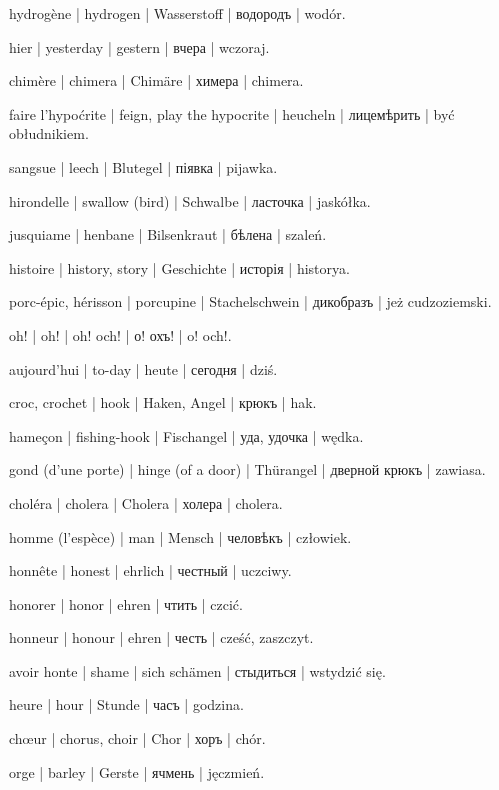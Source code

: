 \begin{outdent}{1em}
hydrogène | hydrogen | Wasserstoff | водородъ | wodór.

hier | yesterday | gestern | вчера | wczoraj.

chimère | chimera | Chimäre | химера | chimera.

faire l’hypoćrite | feign, play the hypocrite | heucheln | лицемѣрить | być obłudnikiem.

sangsue | leech | Blutegel | піявка | pijawka.

hirondelle | swallow (bird) | Schwalbe | ласточка | jaskółka.

jusquiame | henbane | Bilsenkraut | бѣлена | szaleń.

histoire | history, story | Geschichte | исторія | historya.

porc-épic, hérisson | porcupine | Stachelschwein | дикобразъ | jeż cudzoziemski.

oh! | oh! | oh! och! | о! охъ! | o! och!.

aujourd’hui | to-day | heute | сегодня | dziś.

croc, crochet | hook | Haken, Angel | крюкъ | hak.

\uvsubentry{}
hameçon | fishing-hook | Fischangel | уда, удочка | wędka.


\uvsubentry{}
gond (d’une porte) | hinge (of a door) | Thürangel | дверной крюкъ | zawiasa.

choléra | cholera | Cholera | холера | cholera.

homme (l’espèce) | man | Mensch | человѣкъ | człowiek.

honnête | honest | ehrlich | честный | uczciwy.

honorer | honor | ehren | чтить | czcić.

\uvsubentry{}
honneur | honour | ehren | честь | cześć, zaszczyt.

avoir honte | shame | sich schämen | стыдиться | wstydzić
się.

heure | hour | Stunde | часъ | godzina.

chœur | chorus, choir | Chor | хоръ | chór.

orge | barley | Gerste | ячмень | jęczmień.


\end{outdent}
